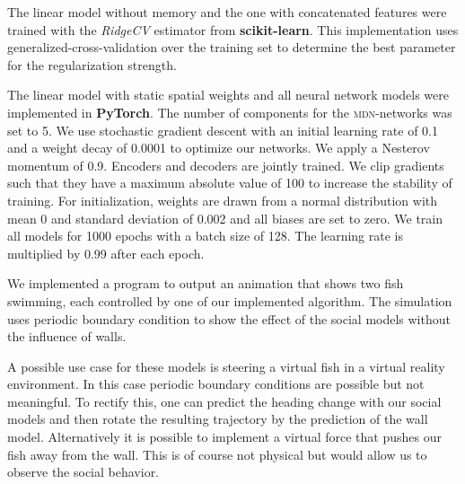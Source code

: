 \documentclass[nobib, a4paper]{tufte-handout}
\begin{document}
The linear model without memory and the one with concatenated features were trained with the \textit{RidgeCV} estimator from \textbf{scikit-learn}\autocite{scikitLearn}.
This implementation uses generalized-cross-validation over the training set to determine the best parameter for the regularization strength.

The linear model with static spatial weights and all neural network models were implemented in \textbf{PyTorch}.
The number of components for the \textsc{mdn}-networks was set to 5.
We use stochastic gradient descent with an initial learning rate of 0.1 and a weight decay of 0.0001 to optimize our networks.
We apply a Nesterov momentum of 0.9.
Encoders and decoders are jointly trained.
We clip gradients such that they have a maximum absolute value of 100 to increase the stability of training.
For initialization, weights are drawn from a normal distribution with mean 0 and standard deviation of 0.002 and all biases are set to zero.
We train all models for 1000 epochs with a batch size of 128.
The learning rate is multiplied by 0.99 after each epoch.

We implemented a program to output an animation that shows two fish swimming, each controlled by one of our implemented algorithm.
The simulation uses periodic boundary condition to show the effect of the social models without the influence of walls.

A possible use case for these models is steering a virtual fish in a virtual reality environment\autocite{animalVr}.
In this case periodic boundary conditions are possible but not meaningful.
To rectify this, one can predict the heading change with our social models and then rotate the resulting trajectory by the prediction of the wall model.
Alternatively it is possible to implement a virtual force that pushes our fish away from the wall.
This is of course not physical but would allow us to observe the social behavior.
\end{document}
